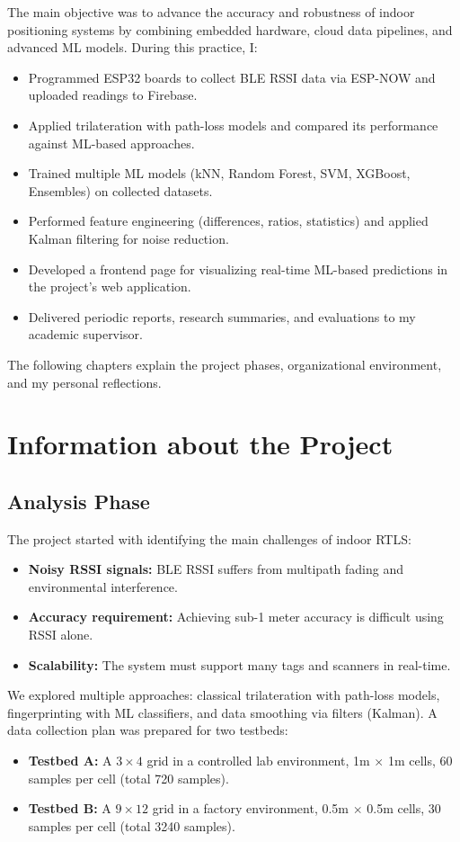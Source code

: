 \documentclass[a4paper,12pt]{report}
\begin{document}
The main objective was to advance the accuracy and robustness of indoor positioning systems by combining embedded hardware, cloud data pipelines, and advanced ML models.  
During this practice, I:
\begin{itemize}
    \item Programmed ESP32 boards to collect BLE RSSI data via ESP-NOW and uploaded readings to Firebase.
    \item Applied trilateration with path-loss models and compared its performance against ML-based approaches.
    \item Trained multiple ML models (kNN, Random Forest, SVM, XGBoost, Ensembles) on collected datasets.
    \item Performed feature engineering (differences, ratios, statistics) and applied Kalman filtering for noise reduction.
    \item Developed a frontend page for visualizing real-time ML-based predictions in the project’s web application.
    \item Delivered periodic reports, research summaries, and evaluations to my academic supervisor.
\end{itemize}

The following chapters explain the project phases, organizational environment, and my personal reflections.

\chapter{Information about the Project}

\section{Analysis Phase}
The project started with identifying the main challenges of indoor RTLS:
\begin{itemize}
    \item \textbf{Noisy RSSI signals:} BLE RSSI suffers from multipath fading and environmental interference.
    \item \textbf{Accuracy requirement:} Achieving sub-1 meter accuracy is difficult using RSSI alone.
    \item \textbf{Scalability:} The system must support many tags and scanners in real-time.
\end{itemize}

We explored multiple approaches: classical trilateration with path-loss models, fingerprinting with ML classifiers, and data smoothing via filters (Kalman).  
A data collection plan was prepared for two testbeds:
\begin{itemize}
    \item \textbf{Testbed A:} A $3 \times 4$ grid in a controlled lab environment, 1m $\times$ 1m cells, 60 samples per cell (total 720 samples).
    \item \textbf{Testbed B:} A $9 \times 12$ grid in a factory environment, 0.5m $\times$ 0.5m cells, 30 samples per cell (total 3240 samples).
\end{itemize}
\end{document}
